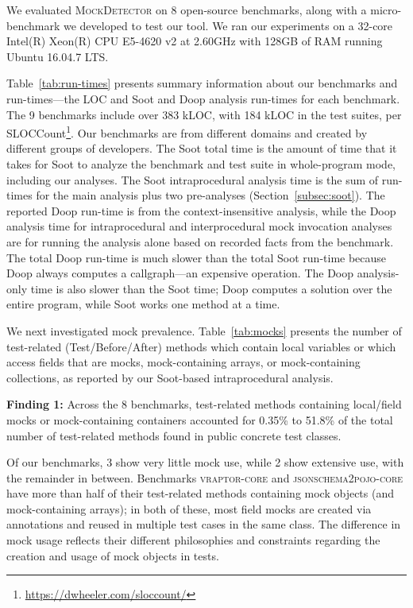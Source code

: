 We evaluated \textsc{MockDetector} on 8 open-source benchmarks, along with a micro-benchmark we developed to test our tool. We ran our experiments on a 32-core Intel(R) Xeon(R) CPU E5-4620 v2 at 2.60GHz with 128GB of RAM running Ubuntu 16.04.7 LTS.

Table~\ref{tab:run-times} presents summary information about our benchmarks and run-times---the LOC and Soot and Doop analysis run-times for each benchmark. The 9 benchmarks include over 383 kLOC, with 184 kLOC in the test suites, per SLOCCount\footnote{\url{https://dwheeler.com/sloccount/}}.  Our benchmarks are from different domains and created by different groups of developers. The Soot total time is the amount of time that it takes for Soot to analyze the benchmark and test suite in whole-program mode, including our analyses. The Soot intraprocedural analysis time is the sum of run-times for the main analysis plus two pre-analyses (Section~\ref{subsec:soot}). The reported Doop run-time is from the context-insensitive analysis, while the Doop analysis time for intraprocedural and interprocedural mock invocation analyses are for running the analysis alone based on recorded facts from the benchmark. The total Doop run-time is much slower than the total Soot run-time because Doop always computes a callgraph---an expensive operation. The Doop analysis-only time is also slower than the Soot time; Doop computes a solution over the entire program, while Soot works one method at a time.

We next investigated mock prevalence. Table~\ref{tab:mocks} presents the number of test-related (Test/Before/After) methods which contain local variables or which access fields that are mocks, mock-containing arrays, or mock-containing collections, as reported by our Soot-based intraprocedural analysis. 

\begin{mdframed}[
  leftmargin=\parindent,
  rightmargin=\parindent,
  skipabove=\topsep,
  skipbelow=\topsep
  ]
{\bf Finding 1:} Across the 8 benchmarks, test-related methods containing local/field mocks or mock-containing containers accounted for 0.35\% to 51.8\% of the total number of test-related methods found in public concrete test classes.
\end{mdframed}

Of our benchmarks, 3 show very little mock use, while 2 show extensive use, with the remainder in between. Benchmarks \textsc{vraptor-core} and \textsc{jsonschema2pojo-core} have more than half of their test-related methods containing mock objects (and mock-containing arrays); in both of these, most field mocks are created via annotations and reused in multiple test cases in the same class. The difference in mock usage reflects their different philosophies and constraints regarding the creation and usage of mock objects in tests.

